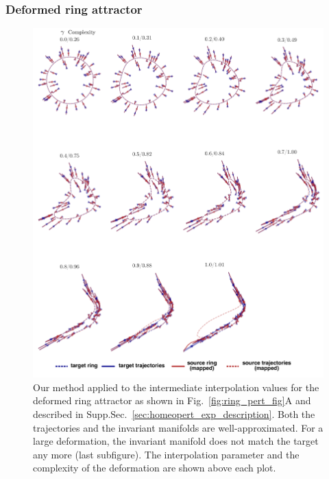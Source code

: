 \documentclass{article}
\theoremstyle{definition} \newtheorem{definition}{Definition}  \newtheorem{example}{Example}
\theoremstyle{remark} \newtheorem{remark}{Remark}
\newcounter{ct}
\begin{document}
\subsubsection{Deformed ring attractor}
\begin{figure}[htbp]
    \centering
    \includegraphics[width=\linewidth]{deformed_both_trajectories_asy}
    \caption{Our method applied to the intermediate interpolation values for the deformed ring attractor as shown in Fig.~\ref{fig:ring_pert_fig}A and described in 
	Supp.Sec.~\ref{sec:homeopert_exp_description}.
	Both the trajectories and the invariant manifolds are well-approximated. 
	For a large deformation, the invariant manifold does not match the target any more (last subfigure).
	The interpolation parameter and the complexity of the deformation are shown above each plot.
     }
    \label{fig:deformed_both_trajectories_asy}
\end{figure}
\end{document}
